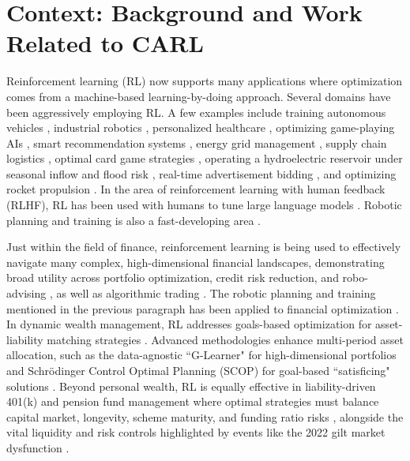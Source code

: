 \documentclass[mnsc,sglanonrev]{informs4}
\begin{document}
\section{Context: Background and Work Related to CARL}
\label{sec:background}

Reinforcement learning (RL) now supports many applications where optimization comes from a machine-based learning-by-doing approach. Several domains have been aggressively employing RL. A few examples include training autonomous vehicles \citep{kiran_deep_2020}, industrial robotics \citep{kober_reinforcement_2013}, personalized healthcare \citep{murphy_optimal_2003}, optimizing game-playing AIs \citep{mnih_playing_2013, mnih_human-level_2015, silver_mastering_2016}, smart recommendation systems \citep{Zheng_drn_2018}, energy grid management \citep{vazquez-canteli_reinforcement_2019}, supply chain logistics \citep{giannoccaro_inventory_2002}, optimal card game strategies \citep{sutton_reinforcement_2018},
operating a hydroelectric reservoir under seasonal inflow and flood risk \citep{xie_deep_2026}, real-time advertisement bidding \citep{cai_real-time_2017}, and optimizing rocket propulsion \citep{rozada_matrix_2024}.
In the area of reinforcement learning with human feedback (RLHF), RL has been used with humans to tune large language models \citep{ouyang_training_2022}. Robotic planning and training is also a fast-developing area \citep{li_formal_2019}. 


Just within the field of finance, reinforcement learning is being used to effectively navigate many complex, high-dimensional financial landscapes, demonstrating broad utility across portfolio optimization, credit risk reduction, and robo-advising \citep{malibari_systematic_2023}, as well as algorithmic trading \citep{moody_learning_2001}. The robotic planning and training mentioned in the previous paragraph has been applied to financial optimization \citep{ndikum_advancing_2024}. In dynamic wealth management, RL addresses goals-based optimization for asset-liability matching strategies \citep{ huang_optimal_2010}. Advanced methodologies enhance multi-period asset allocation, such as the data-agnostic ``G-Learner" for high-dimensional portfolios \citep{dixon_g-learner_2020} and Schrödinger Control Optimal Planning (SCOP) for goal-based ``satisficing" solutions \citep{halperin_scop_2023}. Beyond personal wealth, RL is equally effective in liability-driven 401(k) and pension fund management where optimal strategies must balance capital market, longevity, scheme maturity, and funding ratio risks \citep{cox_managing_2013, das_augmenting_2026, zhao_what_2021}, alongside the vital liquidity and risk controls highlighted by events like the 2022 gilt market dysfunction \citep{kodres_too_2023}.
\end{document}
